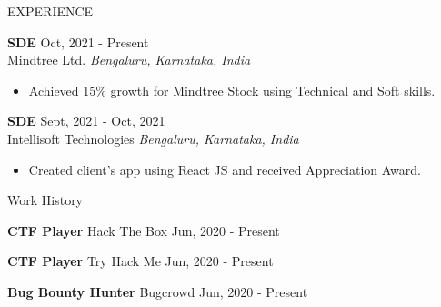 \documentclass{resume} %
\begin{document}
 \begin{rSection}{EXPERIENCE}

 \textbf{SDE} \hfill Oct, 2021 - Present\\
 Mindtree Ltd. \hfill \textit{Bengaluru, Karnataka, India}
 \begin{itemize}
    \itemsep -3pt {} 
     \item Achieved 15\% growth for Mindtree Stock using Technical and Soft skills.
 \end{itemize}
 
 \textbf{SDE} \hfill Sept, 2021 - Oct, 2021\\
 Intellisoft Technologies \hfill \textit{Bengaluru, Karnataka, India}
  \begin{itemize}
     \itemsep -3pt {} 
      \item Created client's app using React JS and received Appreciation Award. 
  \end{itemize}

 \end{rSection} 

\begin{rSection}{Work History}
\vspace{-1.25em}
\item \textbf{CTF Player} {Hack The Box} \hfill Jun, 2020 - Present
\item \textbf{CTF Player} {Try Hack Me} \hfill Jun, 2020 - Present
\item \textbf{Bug Bounty Hunter} {Bugcrowd} \hfill Jun, 2020 - Present
\end{rSection} 

\end{document}

